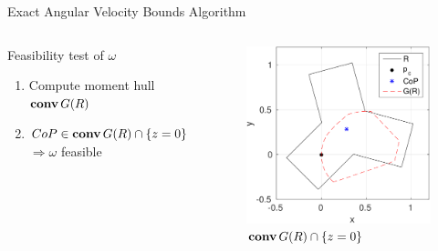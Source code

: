\documentclass[10pt]{beamer}
\newcommand{\conv}{\mathop{\bf conv}}
\begin{document}
\begin{frame}{Exact Angular Velocity Bounds Algorithm}
\begin{columns}[T,onlytextwidth]
    \begin{list}{}{
        \setlength{\leftmargin}{0pt}
        \setlength{\labelwidth}{0pt}
      }
    \item Feasibility test of $\omega$
      \begin{enumerate}
      \item Compute moment hull $\conv G(R)$
      \item $CoP \in \conv G(R) \cap \{z=0\}$ $\Rightarrow \omega$ feasible
      \end{enumerate}
    \end{list}
    \begin{figure}[t]
      \centering
      \includegraphics[width=0.7\linewidth]{fig/CoP_boundary}
      \caption{$\conv G(R) \cap \{z=0\}$}
    \end{figure}
  \end{columns}
\end{frame}
\end{document}
